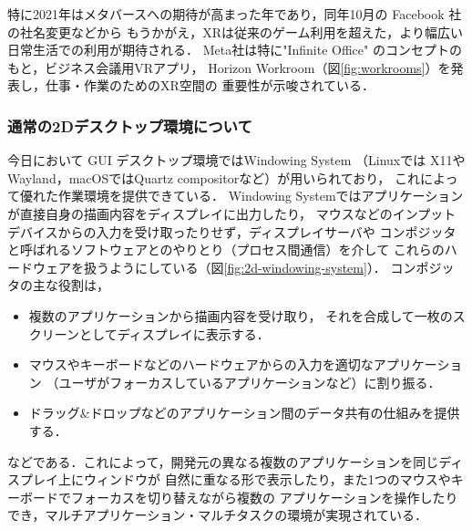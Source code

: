 特に2021年はメタバースへの期待が高まった年であり，同年10月の Facebook 社の社名変更などから
もうかがえ，XRは従来のゲーム利用を超えた，より幅広い日常生活での利用が期待される．
Meta社は特に"Infinite Office" のコンセプトのもと，ビジネス会議用VRアプリ，
Horizon Workroom（図\ref{fig:workrooms}）を発表し，仕事・作業のためのXR空間の
重要性が示唆されている．


\subsubsection{通常の2Dデスクトップ環境について}

今日において GUI デスクトップ環境ではWindowing System
（Linuxでは X11やWayland，macOSではQuartz compositorなど）が用いられており，
これによって優れた作業環境を提供できている．
Windowing Systemではアプリケーションが直接自身の描画内容をディスプレイに出力したり，
マウスなどのインプットデバイスからの入力を受け取ったりせず，ディスプレイサーバや
コンポジッタと呼ばれるソフトウェアとのやりとり（プロセス間通信）を介して
これらのハードウェアを扱うようにしている（図\ref{fig:2d-windowing-system}）．
コンポジッタの主な役割は，
\begin{itemize}
  \item 複数のアプリケーションから描画内容を受け取り，
        それを合成して一枚のスクリーンとしてディスプレイに表示する．
  \item マウスやキーボードなどのハードウェアからの入力を適切なアプリケーション
        （ユーザがフォーカスしているアプリケーションなど）に割り振る．
  \item ドラッグ\&ドロップなどのアプリケーション間のデータ共有の仕組みを提供する．
\end{itemize}
などである．これによって，開発元の異なる複数のアプリケーションを同じディスプレイ上にウィンドウが
自然に重なる形で表示したり，また1つのマウスやキーボードでフォーカスを切り替えながら複数の
アプリケーションを操作したりでき，マルチアプリケーション・マルチタスクの環境が実現されている．


